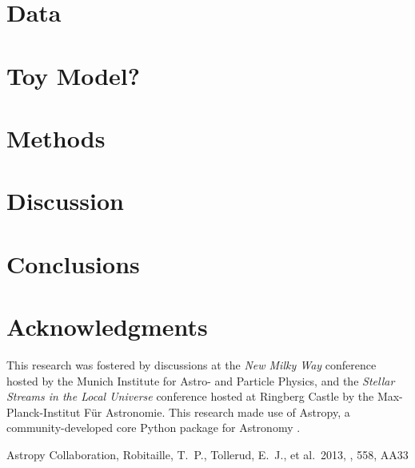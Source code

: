\documentclass[useAMS,usenatbib]{mn2e}
\begin{document}
\section[]{Data}

\section[]{Toy Model?}

\section[]{Methods}

\section[]{Discussion}

\section{Conclusions}


\section*{Acknowledgments}
This research was fostered by discussions at the \textit{New Milky Way} conference hosted by the Munich Institute for Astro- and Particle Physics, and the \textit{Stellar Streams in the Local Universe} conference hosted at Ringberg Castle by the Max-Planck-Institut F\"ur Astronomie. This research made use of Astropy, a community-developed core Python package for Astronomy \citep{astropy}.

\begin{thebibliography}{99}
 Astropy Collaboration, Robitaille, T.~P., Tollerud, E.~J., et al.\ 2013, \aap, 558, AA33
\end{thebibliography}


\label{lastpage}
\end{document}
